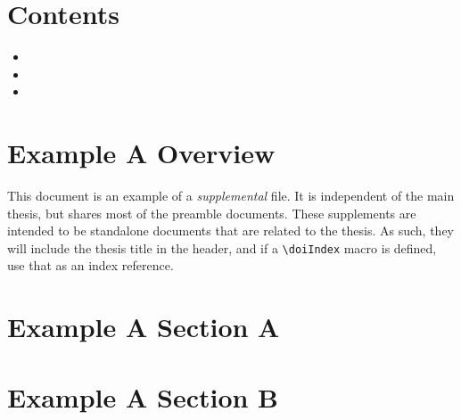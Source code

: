 
\section*{Contents}
\begin{itemize}
	\item {}
	\item {}
	\item {}
\end{itemize}


\section{Example A Overview}
\label{sec:s-example-a.overview}

This document is an example of a \textit{supplemental} file.  It is independent of the main thesis, but shares most of the preamble documents.  These supplements are intended to be standalone documents that are related to the thesis.  As such, they will include the thesis title in the header, and if a \texttt{{\textbackslash}doiIndex} macro is defined, use that as an index reference.


\section{Example A Section A}
\label{sec:s-example-a.a}


\lipsum[1-3]


\section{Example A Section B}
\label{sec:s-example-a.b}

\lipsum[6]

